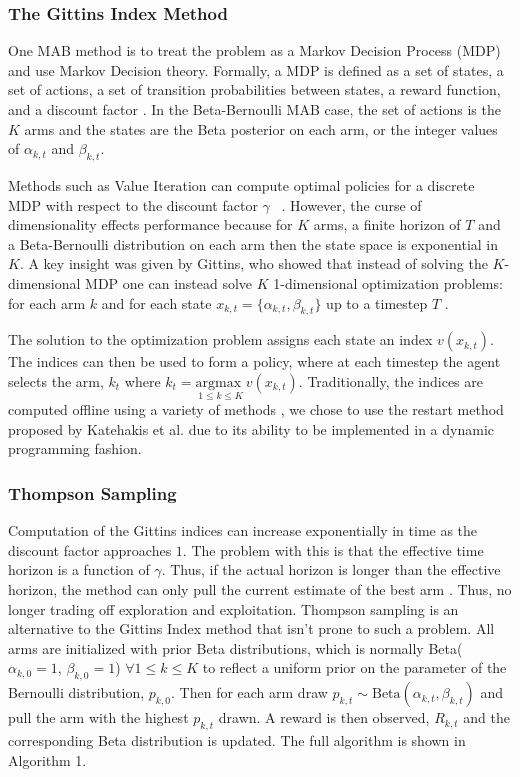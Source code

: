 \documentclass[10pt, conference]{ieeeconf}      %
\begin{document}
\subsubsection{The Gittins Index Method} 
One MAB method is to treat the problem as a Markov Decision Process (MDP) and use Markov Decision theory.
Formally, a MDP is defined as a set of states, a set of actions, a set of transition probabilities between states, a reward function, and a discount factor \cite{barto1998reinforcement}.
In the Beta-Bernoulli MAB case, the set of actions is the $K$ arms and the states are the Beta posterior on each arm, or the integer values of $\alpha_{k,t}$ and $\beta_{k,t}$. 

Methods such as Value Iteration can compute optimal policies for a discrete MDP with respect to the discount factor $\gamma$ ~\cite{barto1998reinforcement}.
However, the curse of dimensionality effects performance because for $K$ arms, a finite horizon of $T$ and a Beta-Bernoulli distribution on each arm then the state space is exponential in $K$.
A key insight was given by Gittins, who showed that instead of solving the $K$-dimensional MDP one can instead solve $K$ 1-dimensional optimization problems: for each arm $k$ and for each state $x_{k,t} = \lbrace \alpha_{k,t}, \beta_{k,t} \rbrace$ up to a timestep $T$ \cite{weber1992gittins}.

The solution to the optimization problem assigns each state an index $v(x_{k,t})$.
The indices can then be used to form a policy, where at each timestep the agent selects the arm, $k_t$ where $k_t= \underset{1 \leq k \leq K}{\mbox{argmax }} v(x_{k,t})$.  Traditionally, the indices are computed offline using a variety of methods \cite{weber1992gittins}, we chose to use the restart method proposed by Katehakis et al. \cite{katehakis1987multi} due to its ability to be implemented in a dynamic programming fashion. 
 

\subsubsection{Thompson Sampling}
Computation of the Gittins indices can increase exponentially in time as the discount factor approaches $1$. The problem with this is that the effective time horizon is a function of $\gamma$. Thus, if the actual horizon is longer than the effective horizon, the method can only pull the current estimate of the best arm \cite{kelly1981multi}. Thus, no longer trading off exploration and exploitation. Thompson sampling is an alternative to the Gittins Index method that isn't prone to such a problem. 
All arms are initialized with prior Beta distributions, which is normally Beta($\alpha_{k,0}=1$,  $\beta_{k,0} =1$) $\forall 1 \leq k \leq K$ to reflect a uniform prior on the parameter of the Bernoulli distribution, $p_{k,0}$.
Then for each arm draw $p_{k,t} \sim \mbox{Beta}(\alpha_{k,t},\beta_{k,t})$ and pull the arm with the highest $p_{k,t}$ drawn.
A reward is then observed, $R_{k,t}$ and the corresponding Beta distribution is updated. The full algorithm is shown in Algorithm 1.  
\end{document}
